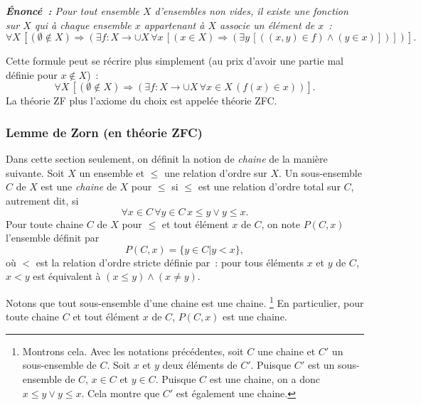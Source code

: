 \noindent\textit{\textbf{Énoncé :} Pour tout ensemble $X$ d'ensembles non vides, il existe une fonction sur $X$ qui à chaque ensemble $x$ appartenant à $X$ associe un élément de $x$ :}
\begin{equation*}
    \forall X \, \left[ (\emptyset \notin X) \Rightarrow \left( \exists f: X \to \cup X \, \forall x \, [ (x \in X) \Rightarrow ( \exists y \, [((x,y) \in f) \wedge (y \in x)] ) ] \right) \right] .
\end{equation*}

\medskip

\noindent Cette formule peut se récrire plus simplement (au prix d'avoir une partie mal définie pour $x \notin X$) :
\begin{equation*}
    \forall X \, \left[ (\emptyset \notin X) \Rightarrow \left( \exists f: X \to \cup X \, \forall x \in X \, (f(x) \in x) \right) \right] .
\end{equation*}
La théorie ZF plus l'axiome du choix est appelée théorie ZFC.

\subsubsection{Lemme de Zorn (en théorie ZFC)}

Dans cette section seulement, on définit la notion de \textit{chaine} de la manière suivante.
Soit $X$ un ensemble et $\leq$ une relation d'ordre sur $X$.
Un sous-ensemble $C$ de $X$ est une \textit{chaine} de $X$ pour $\leq$ si $\leq$ est une relation d'ordre total sur $C$, autrement dit, si
\begin{equation*}
    \forall x \in C \, \forall y \in C \, x \leq y \vee y \leq x .
\end{equation*}
Pour toute chaine $C$ de $X$ pour $\leq$ et tout élément $x$ de $C$, on note $P(C, x)$ l'ensemble définit par
\begin{equation*}
    P(C, x) = \lbrace y \in C \vert y < x \rbrace ,
\end{equation*}
où $<$ est la relation d'ordre stricte définie par : pour tous éléments $x$ et $y$ de $C$, $x < y$ est équivalent à $(x \leq y) \wedge (x \neq y)$.

Notons que tout sous-ensemble d'une chaine est une chaine.%
\footnote{Montrons cela. Avec les notations précédentes, soit $C$ une chaine et $C'$ un sous-ensemble de $C$.
    Soit $x$ et $y$ deux éléments de $C'$.
    Puisque $C'$ est un sous-ensemble de $C$, $x \in C$ et $y \in C$.
    Puisque $C$ est une chaine, on a donc $x \leq y \vee y \leq x$.
    Cela montre que $C'$ est également une chaine.}
En particulier, pour toute chaine $C$ et tout élément $x$ de $C$, $P(C, x)$ est une chaine.

